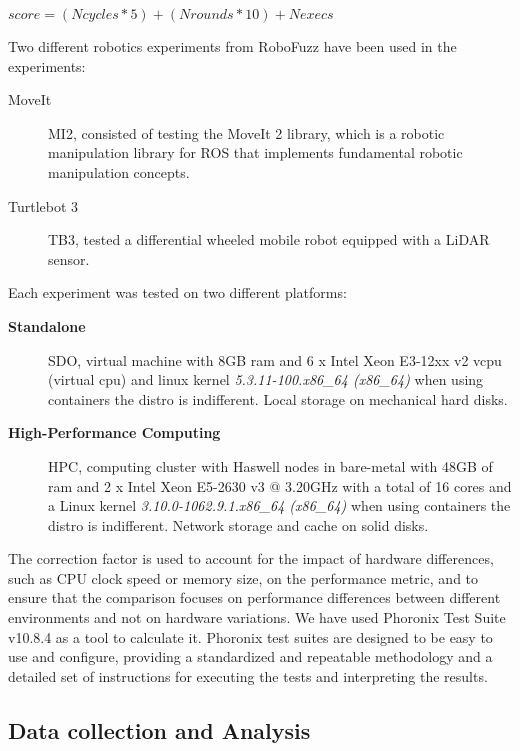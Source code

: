 \documentclass{svproc}
\begin{document}
\begin{center}
    \begin{math}
        score = (Ncycles * 5) + (Nrounds * 10) + Nexecs
    \end{math}
\end{center}

  
Two different robotics experiments from RoboFuzz have been used in the experiments:
\begin{description}
    \item  [MoveIt] MI2, consisted of testing the MoveIt 2 library, which is a robotic manipulation library for ROS that implements fundamental robotic manipulation concepts. 
    \item [Turtlebot 3] TB3, tested a differential wheeled mobile robot equipped with a LiDAR sensor.
    
\end{description} 

Each experiment was tested on two different platforms:

\begin{description}
    \item [\textbf{Standalone}] SDO,  virtual machine with 8GB ram and 6 x Intel Xeon E3-12xx v2 vcpu (virtual cpu) and linux kernel \textit{5.3.11-100.x86\_64 (x86\_64)} when using containers the distro is indifferent. Local storage on mechanical hard disks.  
    \item [\textbf{High-Performance Computing}] HPC, computing cluster with Haswell nodes in bare-metal with 48GB of ram and 2 x Intel Xeon E5-2630 v3 @ 3.20GHz with a total of 16 cores and a Linux kernel \textit{3.10.0-1062.9.1.x86\_64 (x86\_64) } when using containers the distro is indifferent.
    Network storage and cache on solid disks. 
\end{description}


The correction factor is used to account for the impact of hardware differences, such as CPU clock speed or memory size, on the performance metric, and to ensure that the comparison focuses on performance differences between different environments and not on hardware variations. We have used Phoronix Test Suite v10.8.4 as a tool to calculate it. Phoronix test suites are designed to be easy to use and configure, providing a standardized and repeatable methodology and a detailed set of instructions for executing the tests and interpreting the results.


\subsection{Data collection and Analysis}
\end{document}
